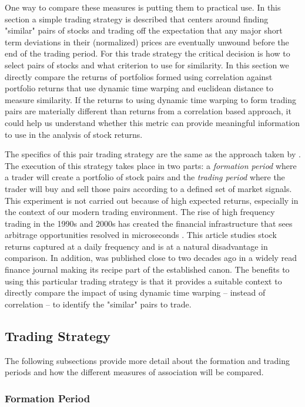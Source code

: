 One way to compare these measures is putting them to practical use. In this section a simple trading strategy is described that centers around finding "similar" pairs of stocks and trading off the expectation that any major short term deviations in their (normalized) prices are eventually unwound before the end of the trading period. For this trade strategy the critical decision is how to select pairs of stocks and what criterion to use for similarity. In this section we directly compare the returns of portfolios formed using correlation against portfolio returns that use dynamic time warping and euclidean distance to measure similarity. If the returns to using dynamic time warping to form trading pairs are materially different than returns from a correlation based approach, it could help us understand whether this metric can provide meaningful information to use in the analysis of stock returns.

The specifics of this pair trading strategy are the same as the approach taken by \cite{Gatev_et_al_2006}. The execution of this strategy takes place in two parts: a \textit{formation period} where a trader will create a portfolio of stock pairs and the \textit{trading period} where the trader will buy and sell those pairs according to a defined set of market signals. This experiment is not carried out because of high expected returns, especially in the context of our modern trading environment. The rise of high frequency trading in the 1990s and 2000s has created the financial infrastructure that sees arbitrage opportunities resolved in microseconds \cite{Aquilina_et_al_2021}. This article studies stock returns captured at a daily frequency and is at a natural disadvantage in comparison. In addition, \cite{Gatev_et_al_2006} was published close to two decades ago in a widely read finance journal making its recipe part of the established canon. The benefits to using this particular trading strategy is that it provides a suitable context to directly compare the impact of using dynamic time warping -- instead of correlation -- to identify the "similar" pairs to trade.

\subsection{Trading Strategy}

The following subsections provide more detail about the formation and trading periods and how the different measures of association will be compared.

\subsubsection{Formation Period}

